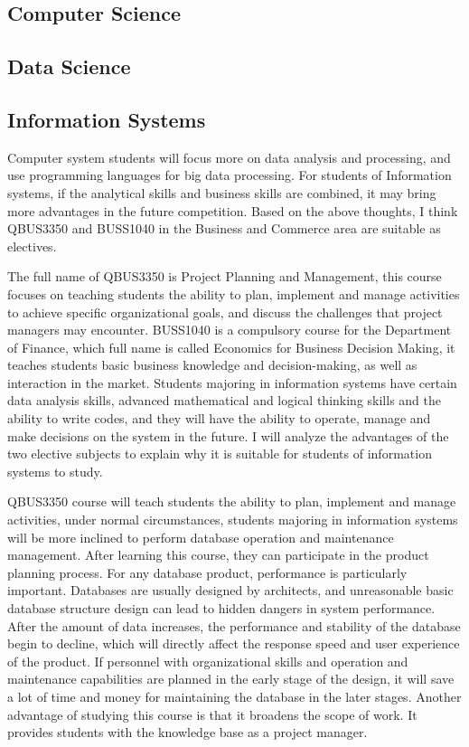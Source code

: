 \documentclass[12pt]{article}
\begin{document}
\subsection{Computer Science}


\subsection{Data Science}


\subsection{Information Systems}

Computer system students will focus more on data analysis and processing, and use programming languages for big data processing. For students of Information systems, if the analytical skills and business skills are combined, it may bring more advantages in the future competition. Based on the above thoughts, I think QBUS3350 and BUSS1040 in the Business and Commerce area are suitable as electives.

The full name of QBUS3350 is Project Planning and Management, this course focuses on teaching students the ability to plan, implement and manage activities to achieve specific organizational goals, and discuss the challenges that project managers may encounter. BUSS1040 is a compulsory course for the Department of Finance, which full name is called Economics for Business Decision Making, it teaches students basic business knowledge and decision-making, as well as interaction in the market. Students majoring in information systems have certain data analysis skills, advanced mathematical and logical thinking skills and the ability to write codes, and they will have the ability to operate, manage and make decisions on the system in the future. I will analyze the advantages of the two elective subjects to explain why it is suitable for students of information systems to study.

QBUS3350 course will teach students the ability to plan, implement and manage activities, under normal circumstances, students majoring in information systems will be more inclined to perform database operation and maintenance management. After learning this course, they can participate in the product planning process. For any database product, performance is particularly important. Databases are usually designed by architects, and unreasonable basic database structure design can lead to hidden dangers in system performance. After the amount of data increases, the performance and stability of the database begin to decline, which will directly affect the response speed and user experience of the product. If personnel with organizational skills and operation and maintenance capabilities are planned in the early stage of the design, it will save a lot of time and money for maintaining the database in the later stages. Another advantage of studying this course is that it broadens the scope of work. It provides students with the knowledge base as a project manager.
\end{document}
